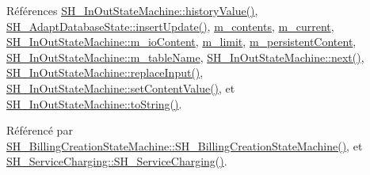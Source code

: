 Références \hyperlink{classSH__InOutStateMachine_af71bfdb3b59b7bf2763588b513b4205f}{S\-H\-\_\-\-In\-Out\-State\-Machine\-::history\-Value()}, \hyperlink{classSH__AdaptDatabaseState_a037db544ea05f42d21fcbdda758839fe}{S\-H\-\_\-\-Adapt\-Database\-State\-::insert\-Update()}, \hyperlink{classSh__LoopingInOutStateMachine_a267e7cbcb3d6a137e2a4e1f93fb57e68}{m\-\_\-contents}, \hyperlink{classSh__LoopingInOutStateMachine_a6bcf7bcfe684dbd4d11ed327948e161b}{m\-\_\-current}, \hyperlink{classSH__InOutStateMachine_a661a1c7bd3b1086b3b5cd60ca957ecbd}{S\-H\-\_\-\-In\-Out\-State\-Machine\-::m\-\_\-io\-Content}, \hyperlink{classSh__LoopingInOutStateMachine_a320ece6cf74c2667c70059b9421117fb}{m\-\_\-limit}, \hyperlink{classSh__LoopingInOutStateMachine_ad9c0db5b057a6ba340ffcaddce60d6da}{m\-\_\-persistent\-Content}, \hyperlink{classSH__InOutStateMachine_acc0f5d5133af2dcca30939f53ec8837b}{S\-H\-\_\-\-In\-Out\-State\-Machine\-::m\-\_\-table\-Name}, \hyperlink{classSH__InOutStateMachine_a9cd7dbaf4da10a65d788a5d85397bebe}{S\-H\-\_\-\-In\-Out\-State\-Machine\-::next()}, \hyperlink{classSH__InOutStateMachine_a9fa5db44086de2576c812f631aa4f60a}{S\-H\-\_\-\-In\-Out\-State\-Machine\-::replace\-Input()}, \hyperlink{classSH__InOutStateMachine_a9ab1534306b2bdb62743d4bcefe40c17}{S\-H\-\_\-\-In\-Out\-State\-Machine\-::set\-Content\-Value()}, et \hyperlink{classSH__InOutStateMachine_abfd2be3aa5860e0e92a1a6d30f8e36ce}{S\-H\-\_\-\-In\-Out\-State\-Machine\-::to\-String()}.



Référencé par \hyperlink{classSH__BillingCreationStateMachine_ad62b77fa4aeafe200056ff3974562f83}{S\-H\-\_\-\-Billing\-Creation\-State\-Machine\-::\-S\-H\-\_\-\-Billing\-Creation\-State\-Machine()}, et \hyperlink{classSH__ServiceCharging_afa5273d046049b1c2b020a6a19a8290b}{S\-H\-\_\-\-Service\-Charging\-::\-S\-H\-\_\-\-Service\-Charging()}.


